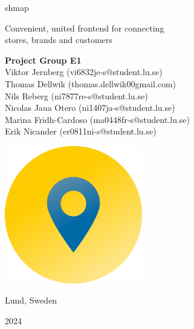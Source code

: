 \documentclass[titlepage]{article}
\def\companyName{shmap}
\begin{document}
\begin{titlepage}
    \begin{center}
        \vspace*{1.5cm}

        {\selectfont
            {\Huge \companyName}
        }

        \vspace{0.5cm}
            {\large Convenient, united frontend for connecting\\
        stores, brands and customers}
            
        \vspace{1.25cm}

        \textbf{Project Group E1} \\
        {\normalsize Viktor Jernberg (vi6832je-s@student.lu.se)\\Thomas Dellwik (thomas.dellwik00gmail.com)\\Nils Reberg (ni7877re-s@student.lu.se)\\Nicolas Jaua Otero (ni1407ja-s@student.lu.se)\\Marina Fridh-Cardoso (ma0448fr-s@student.lu.se)\\Erik Nicander (er0811ni-s@student.lu.se)}

        \vspace{1.25cm}

        \includegraphics[width=0.45\textwidth]{logo_gradient.png}
       
        \vspace{1.5cm}

        {\Large Lund, Sweden}

        \vspace{0.5cm}
        
        {\Large 2024}\\
            
    \end{center}
\end{titlepage}
\end{document}

